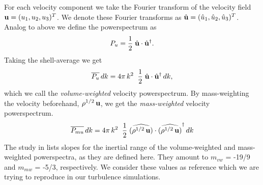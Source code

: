 For each velocity component we take the Fourier transform of the velocity field
$\mathbf{u} = (u_1, u_2, u_3)^T$.
We denote these Fourier transforms as
$\hat{\mathbf{u}} = (\hat{u}_1, \hat{u}_2, \hat{u}_3)^T$. Analog
to above we define the powerspectrum as
\begin{equation}
    P_{u} = \frac{1}{2} \; \hat{\mathbf{u}} \cdot \hat{\mathbf{u}}^{\dagger}.
\end{equation}
Taking the shell-average we get
\begin{equation}
    \overline{P_{u}}\,dk = 4 \pi\,k^2 \;\; \frac{1}{2} \; \hat{\mathbf{u}} \cdot \hat{\mathbf{u}}^{\dagger}\,dk,
\end{equation}
which we call the \emph{volume-weighted} velocity powerspectrum. By
mass-weighting the velocity beforehand, $\rho^{1/2}\,\mathbf{u}$, we get the
\emph{mass-weighted} velocity powerspectrum.
\begin{equation}
    \overline{P_{mu}}\,dk = 4 \pi\,k^2 \;\; \frac{1}{2} \; \widehat{(\rho^{1/2}\,\mathbf{u})} \cdot \widehat{(\rho^{1/2}\,\mathbf{u})}^{\dagger}\,dk
\end{equation}
The study in \cite{kitsionas2009algorithmic} lists slopes for the inertial range
of the volume-weighted and mass-weighted powerspectra, as they are defined
here. They amount to $m_{vw}$ = -19/9 and $m_{mw}$ = -5/3, respectively. We
consider these values as reference which we are trying to reproduce in our
turbulence simulations.


